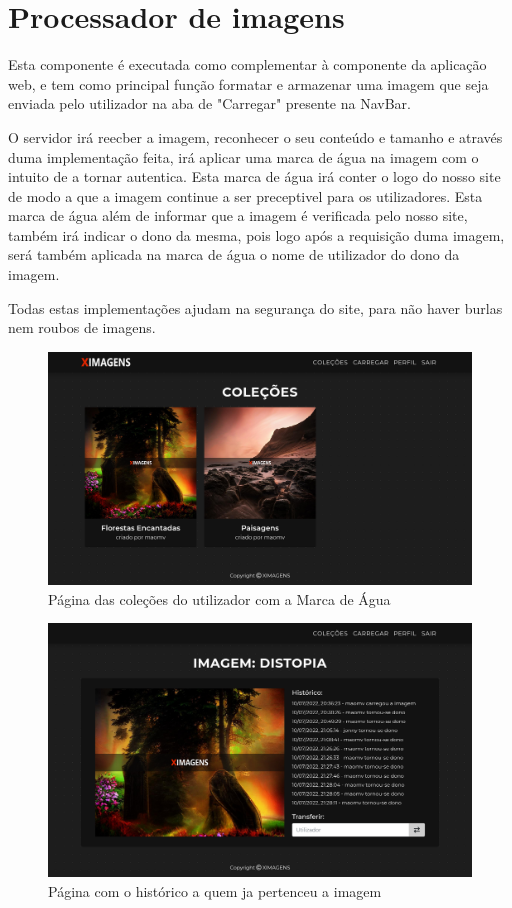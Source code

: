 \documentclass{report}
\begin{document}
\chapter{Processador de imagens}
Esta componente é executada como complementar à componente da aplicação web, e tem como principal função formatar e armazenar uma imagem que seja enviada pelo utilizador na aba de "Carregar" presente na NavBar.

O servidor irá reecber a imagem, reconhecer o seu conteúdo e tamanho e através duma implementação feita, irá aplicar uma marca de água na imagem com o intuito de a tornar autentica. Esta marca de água irá conter o logo do nosso site de modo a que a imagem continue a ser preceptivel para os utilizadores.
Esta marca de água além de informar que a imagem é verificada pelo nosso site, também irá indicar o dono da mesma, pois logo após a requisição duma imagem, será também aplicada na marca de água o nome de utilizador do dono da imagem.

Todas estas implementações ajudam na segurança do site, para não haver burlas nem roubos de imagens.

\begin{figure}[H]
    \centering
    \includegraphics[width=\textwidth]{colecoes.png}
    \caption{Página das coleções do utilizador com a Marca de Água}
\end{figure}

\begin{figure}[H]
    \centering
    \includegraphics[width=\textwidth]{history.png}
    \caption{Página com o histórico a quem ja pertenceu a imagem}
\end{figure}
\end{document}
